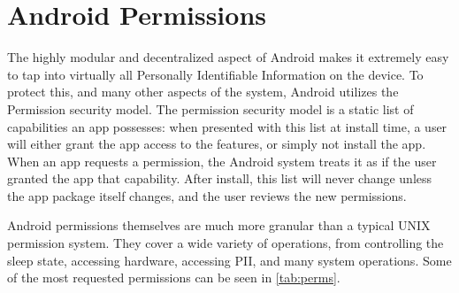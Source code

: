 \section{Android Permissions}
The highly modular and decentralized aspect of Android makes it extremely easy to tap into virtually all Personally Identifiable Information on the device. To protect this, and many other aspects of the system, Android utilizes the Permission security model. The permission security model is a static list of capabilities an app possesses: when presented with this list at install time, a user will either grant the app access to the features, or simply not install the app. When an app requests a permission, the Android system treats it as if the user granted the app that capability. After install, this list will never change unless the app package itself changes, and the user reviews the new permissions.

Android permissions themselves are much more granular than a typical UNIX permission system. They cover a wide variety of operations, from controlling the sleep state, accessing hardware, accessing PII, and many system operations. Some of the most requested permissions can be seen in \ref{tab:perms}.






